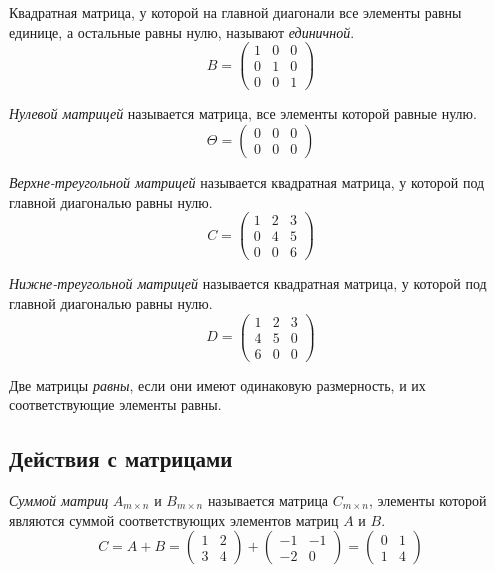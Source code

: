 \begin{definition}
  Квадратная матрица, у которой на главной диагонали все элементы равны единице, а остальные равны нулю, называют \textit{единичной}. \[
  B = \begin{pmatrix}
    1 & 0 & 0 \\
    0 & 1 & 0 \\
    0 & 0 & 1
  \end{pmatrix}
  \] 
\end{definition}

\begin{definition}
  \textit{Нулевой матрицей} называется матрица, все элементы которой равные нулю. \[
  \Theta = \begin{pmatrix}
    0 & 0 & 0 \\
    0 & 0 & 0
  \end{pmatrix}
  \] 
\end{definition}

\begin{definition}
  \textit{Верхне-треугольной матрицей} называется квадратная матрица, у которой под главной диагональю равны нулю. \[
  C = \begin{pmatrix}
    1 & 2 & 3 \\
    0 & 4 & 5 \\
    0 & 0 & 6
  \end{pmatrix}
  \] 
\end{definition}

\begin{definition}
  \textit{Нижне-треугольной матрицей} называется квадратная матрица, у которой под главной диагональю равны нулю. \[
  D = \begin{pmatrix}
    1 & 2 & 3 \\
    4 & 5 & 0 \\
    6 & 0 & 0
  \end{pmatrix}
  \] 
\end{definition}

Две матрицы \textit{равны}, если они имеют одинаковую размерность, и их соответствующие элементы равны. 

\subsection{Действия с матрицами}

\begin{definition}
  \textit{Суммой матриц} $A_{m \times n}$ и $B_{m \times n}$ называется матрица $C_{m \times n}$, элементы которой являются суммой соответствующих элементов матриц $A$ и $B$. \[
  C = A + B = \begin{pmatrix}
    1 & 2 \\
    3 & 4
  \end{pmatrix}
  +
  \begin{pmatrix}
    -1 & -1 \\
    -2 & 0
  \end{pmatrix}
  =
  \begin{pmatrix}
    0 & 1 \\
    1 & 4
  \end{pmatrix}
  \] 
\end{definition}

